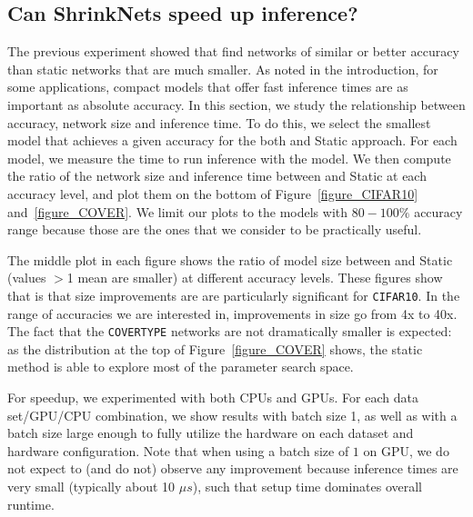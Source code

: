 \subsection{Can ShrinkNets speed up inference?}

The previous experiment showed that \shrink find networks of similar or better
accuracy than static networks that are much smaller. As noted in the
introduction, for some applications, compact models that offer fast inference
times are as important as absolute accuracy.
In this section, we study the relationship between accuracy, network size and
inference time.  To do this, we select the smallest model that achieves a given
accuracy for the both \shrink and Static approach.  For each model, we measure
the time to run inference with the model.  We then compute the ratio of the
network size and inference time between \shrink and Static at each accuracy
level, and plot them on the bottom of Figure~\ref{figure_CIFAR10}
and~\ref{figure_COVER}.  We limit our plots to the models with $80-100\%$
accuracy range because those are the ones that we consider to be practically
useful.

The middle plot in each figure shows the ratio of model size between \shrink
and Static (values $>$1 mean \shrink are smaller) at different accuracy levels.
These figures show that is that size improvements are are particularly
significant for  \texttt{CIFAR10}. In the range of accuracies we are interested
in, improvements in size go from 4x to 40x. The fact
that the  \texttt{COVERTYPE} networks are not dramatically smaller is expected:
as the distribution at the top of Figure~\ref{figure_COVER} shows, the static
method is able to explore most of the parameter search space.

For speedup, we experimented with both CPUs and GPUs. For each data set/GPU/CPU
combination, we show results with batch size 1, as well as with a batch size
large enough to fully utilize the hardware on each dataset and hardware
configuration. Note that when using a batch size of $1$ on GPU, we do not expect
to (and do not) observe any improvement because inference times are very small
(typically about 10 $\mu s$), such that setup time dominates overall runtime.

